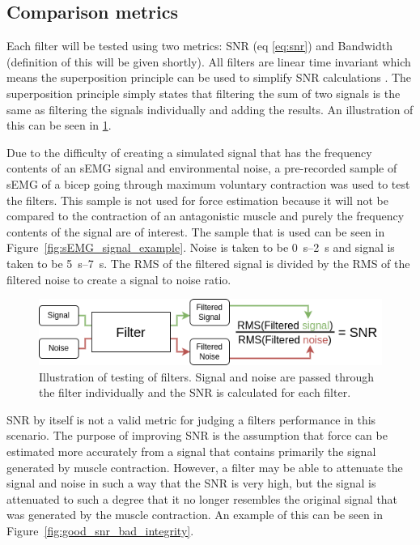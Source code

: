 \subsection{Comparison metrics}
Each filter will be tested using two metrics: SNR (eq \ref{eq:snr}) and Bandwidth (definition of this will be given shortly). All filters are linear time invariant which means the superposition principle can be used to simplify SNR calculations \cite{linear_systems_theory}. The superposition principle simply states that filtering the sum of two signals is the same as filtering the signals individually and adding the results. An illustration of this can be seen in \ref{fig:filter_process}. 

Due to the difficulty of creating a simulated signal that has the frequency contents of an sEMG signal and environmental noise, a pre-recorded sample of sEMG of a bicep going through maximum voluntary contraction was used to test the filters. This sample is not used for force estimation because it will not be compared to the contraction of an antagonistic muscle and purely the frequency contents of the signal are of interest. The sample that is used can be seen in Figure~\ref{fig:sEMG_signal_example}. Noise is taken to be \SIrange{0}{2}{\second} and signal is taken to be \SIrange{5}{7}{\second}. The RMS of the filtered signal is divided by the RMS of the filtered noise to create a signal to noise ratio.

\begin{figure}[h!t]
	\begin{center}
		\includegraphics[width=1.0\columnwidth]{images/filter_process.png}
	\end{center}
	\caption{Illustration of testing of filters. Signal and noise are passed through the filter individually and the SNR is calculated for each filter.}
	\label{fig:filter_process}
\end{figure}

SNR by itself is not a valid metric for judging a filters performance in this scenario. The purpose of improving SNR is the assumption that force can be estimated more accurately from a signal that contains primarily the signal generated by muscle contraction. However, a filter may be able to attenuate the signal and noise in such a way that the SNR is very high, but the signal is attenuated to such a degree that it no longer resembles the original signal that was generated by the muscle contraction. An example of this can be seen in Figure~\ref{fig:good_snr_bad_integrity}. 

